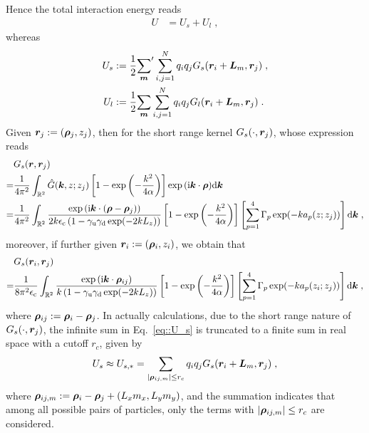 Hence the total interaction energy reads
\begin{align*}
   U & =   U_s+U_l\;,
\end{align*}
whereas
\begin{align}
U_s&:=    \frac{1}{2} {\sum_{\boldsymbol{m}}}^\prime \sum_{i, j = 1}^{N} q_i q_j G_s(\boldsymbol{r}_i+\bm{L}_m, \boldsymbol{r}_j)\;, \label{eq::U_s}\\
U_l&:=   \frac{1}{2} {\sum_{\boldsymbol{m}}}\sum_{i, j = 1}^{N} q_i q_j G_l(\boldsymbol{r}_i+\bm{L}_m, \boldsymbol{r}_j)\;. \label{eq::U_l}
\end{align}
Given $\bm{r}_j:=(\bm{\rho}_j, z_j)$, then for the short range kernel $G_s(\cdot, \boldsymbol{r}_j)$, whose expression reads 
\begin{align*}
 &G_s(\boldsymbol{r}, \boldsymbol{r}_j)\\
 =&   \frac{1}{4\pi^2}\int_{\mathbb{R}^2} \hat{G}(\bm{k}, z; z_j)\left[1-\exp\left(-\frac{k^2}{4\alpha}\right)\right]\exp{(\mathrm{i} \boldsymbol{k} \cdot \boldsymbol{\rho})} \mathrm{d} \bm{k}\\
 =& \frac{1}{4\pi^2}\int_{\mathbb{R}^2} \frac{ \exp{(\mathrm{i} \boldsymbol{k} \cdot (\boldsymbol{\rho}-\boldsymbol{\rho}_j))}}{2k\epsilon_{\mathrm{c}}\left(1-\gamma_{\mathrm{u}}\gamma_{\mathrm{d}}\exp(-2kL_z)\right)} \left[1-\exp\left(-\frac{k^2}{4\alpha}\right)\right]\left[\sum_{p=1}^4\Gamma_p\exp(-ka_p(z;z_j))\right]\mathrm{d} \bm{k}\;,
\end{align*}
moreover, if further given $\boldsymbol{r}_i:=(\bm{\rho}_i, z_i)$, we obtain that 
\begin{align*}
   &G_s(\boldsymbol{r}_i, \boldsymbol{r}_j)\\
   =& \frac{1}{8\pi^2\epsilon_{\mathrm{c}}}\int_{\mathbb{R}^2} \frac{ \exp{(\mathrm{i} \boldsymbol{k} \cdot \boldsymbol{\rho}_{ij})}}{k\left(1-\gamma_{\mathrm{u}}\gamma_{\mathrm{d}}\exp(-2kL_z)\right)} \left[1-\exp\left(-\frac{k^2}{4\alpha}\right)\right]\left[\sum_{p=1}^4\Gamma_p\exp(-ka_p(z_i;z_j))\right]\mathrm{d} \bm{k}\;,
\end{align*}
where $\boldsymbol{\rho}_{ij}:=\bm{\rho}_i-\bm{\rho}_j$. 
In actually calculations, due to the short range nature of~$G_s(\cdot, \boldsymbol{r}_j)$, the infinite sum in Eq.~\eqref{eq::U_s} is truncated to a finite sum in real space with a cutoff $r_c$, given by
\begin{equation}\label{eq::U_s_truncated}
    U_s \approx U_{s, *} = \sum_{\lvert\bm{\rho}_{ij, m}\rvert \leq r_c} q_i q_j G_s(\boldsymbol{r}_i+\bm{L}_m, \boldsymbol{r}_j)\;,
\end{equation}
where $\bm{\rho}_{ij, m}:=\bm{\rho}_i-\bm{\rho}_j+ (L_x m_x, L_y m_y)$, and the summation indicates that among all possible pairs of particles, only the terms with $\lvert\bm{\rho}_{ij, m}\rvert \leq r_c$ are considered.


